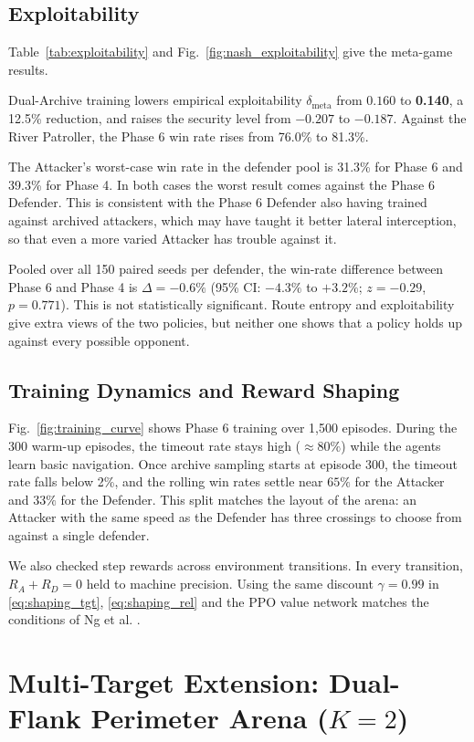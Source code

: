 \documentclass[conference]{IEEEtran}
\begin{document}
\subsection{Exploitability}
Table~\ref{tab:exploitability} and Fig.~\ref{fig:nash_exploitability} give the meta-game results.

Dual-Archive training lowers empirical exploitability $\delta_{\text{meta}}$ from $0.160$ to \textbf{0.140}, a 12.5\% reduction, and raises the security level from $-0.207$ to \textbf{$-0.187$}. Against the River Patroller, the Phase 6 win rate rises from 76.0\% to 81.3\%.

The Attacker's worst-case win rate in the defender pool is 31.3\% for Phase 6 and 39.3\% for Phase 4. In both cases the worst result comes against the Phase 6 Defender. This is consistent with the Phase 6 Defender also having trained against archived attackers, which may have taught it better lateral interception, so that even a more varied Attacker has trouble against it.

Pooled over all 150 paired seeds per defender, the win-rate difference between Phase 6 and Phase 4 is $\Delta = -0.6\%$ (95\% CI: $-4.3\%$ to $+3.2\%$; $z = -0.29$, $p = 0.771$). This is not statistically significant. Route entropy and exploitability give extra views of the two policies, but neither one shows that a policy holds up against every possible opponent.

\subsection{Training Dynamics and Reward Shaping}
Fig.~\ref{fig:training_curve} shows Phase 6 training over 1,500 episodes. During the 300 warm-up episodes, the timeout rate stays high ($\approx 80\%$) while the agents learn basic navigation. Once archive sampling starts at episode 300, the timeout rate falls below 2\%, and the rolling win rates settle near $65\%$ for the Attacker and $33\%$ for the Defender. This split matches the layout of the arena: an Attacker with the same speed as the Defender has three crossings to choose from against a single defender.

We also checked step rewards across environment transitions. In every transition, $R_A + R_D = 0$ held to machine precision. Using the same discount $\gamma = 0.99$ in \eqref{eq:shaping_tgt}, \eqref{eq:shaping_rel} and the PPO value network matches the conditions of Ng et al. \cite{ng1999policy}.

\section{Multi-Target Extension: Dual-Flank Perimeter Arena ($K=2$)}
\label{sec:multi_target}
\end{document}
